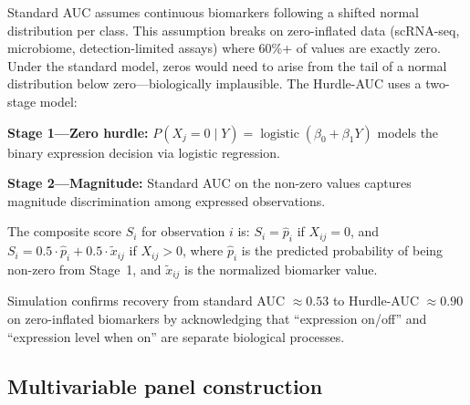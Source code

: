 \documentclass[11pt,a4paper]{article}
\begin{document}
Standard AUC assumes continuous biomarkers following a shifted normal
distribution per class.  This assumption breaks on zero-inflated data
(scRNA-seq, microbiome, detection-limited assays) where 60\%+ of values are
exactly zero.  Under the standard model, zeros would need to arise from the
tail of a normal distribution below zero---biologically implausible.  The
Hurdle-AUC uses a two-stage model:

\textbf{Stage 1---Zero hurdle:}
$P(X_j = 0 \mid Y) = \operatorname{logistic}(\beta_0 + \beta_1 Y)$ models
the binary expression decision via logistic regression.

\textbf{Stage 2---Magnitude:} Standard AUC on the non-zero values captures
magnitude discrimination among expressed observations.

The composite score $S_i$ for observation $i$ is:
$S_i = \hat{p}_i$ if $X_{ij} = 0$, and
$S_i = 0.5 \cdot \hat{p}_i + 0.5 \cdot \tilde{x}_{ij}$ if $X_{ij} > 0$,
where $\hat{p}_i$ is the predicted probability of being non-zero from
Stage~1, and $\tilde{x}_{ij}$ is the normalized biomarker value.

Simulation confirms recovery from standard AUC $\approx 0.53$ to Hurdle-AUC
$\approx 0.90$ on zero-inflated biomarkers by acknowledging that ``expression
on/off'' and ``expression level when on'' are separate biological processes.

\subsection{Multivariable panel construction}
\end{document}
